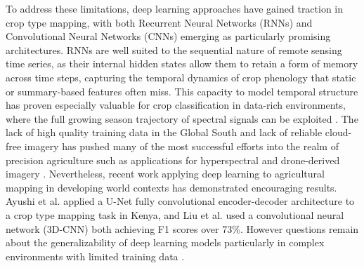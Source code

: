 \documentclass[pdflatex,sn-mathphys]{sn-jnl} %
\begin{document}
To address these limitations, deep learning approaches have gained traction in crop type mapping, with both Recurrent Neural Networks (RNNs) and Convolutional Neural Networks (CNNs) emerging as particularly promising architectures. RNNs are well suited to the sequential nature of remote sensing time series, as their internal hidden states allow them to retain a form of memory across time steps, capturing the temporal dynamics of crop phenology that static or summary-based features often miss. This capacity to model temporal structure has proven especially valuable for crop classification in data-rich environments, where the full growing season trajectory of spectral signals can be exploited \cite{teixeira2023, zhu2017}. The lack of high quality training data in the Global South and lack of reliable cloud-free imagery has pushed many of the most successful efforts into the realm of precision agriculture such as applications for hyperspectral and drone-derived imagery \cite{mahlayeye2024}. Nevertheless, recent work applying deep learning to agricultural mapping in developing world contexts has demonstrated encouraging results. Ayushi et al. \cite{buttar2024} applied a U-Net fully convolutional encoder-decoder architecture to a crop type mapping task in Kenya, and Liu et al. \cite{liu2024} used a convolutional neural network (3D-CNN) both achieving F1 scores over 73\%. However questions remain about the generalizability of deep learning models particularly in complex environments with limited training data \cite{pankajakshan2026}. 
\end{document}
